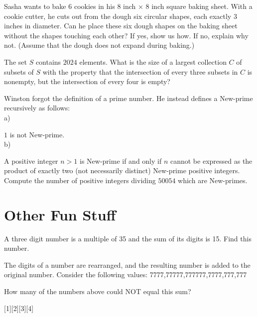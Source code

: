 \begin{problem}[C][6][BAMO 2024/2]
    Sasha wants to bake 6 cookies in his 8 inch × 8 inch square baking sheet. With a cookie cutter, he cuts out from the dough six circular shapes, each exactly 3 inches in diameter. Can he place these six dough shapes on the baking sheet without the shapes touching each other? If yes, show us how. If no, explain why not. (Assume that the dough does not expand during baking.)
\end{problem}


\begin{problem}[C][3][MP4G 2024/14]
    The set $S$ contains $2024$ elements. What is the size of a largest collection $C$ of subsets of $S$ with the property that the intersection of every three subsets in $C$ is nonempty,
  but the intersection of every four is empty?
\end{problem}


\begin{problem}
    Winston forgot the definition of a prime number. He instead defines a New-prime recursively as follows: \\
   a) \item \(1\) is not New-prime. \\
   b) \item A positive integer \( n > 1 \) is New-prime if and only if \( n \) cannot be expressed as the product of exactly two (not necessarily distinct) New-prime positive integers. \\
Compute the number of positive integers dividing \(50054\) which are New-primes.

\end{problem}


\section{Other Fun Stuff}\setcounter{problem}{0}


\begin{problem}
    A three digit number is a multiple of 35 and the sum of its digits is 15. Find this number.
\end{problem}

\begin{problem}
    The digits of a number are rearranged, and the resulting number is added to the original number. Consider the following values:\smallbreak
    \hspace{25pt}777\hfill7,777\hfill77,777\hfill777,777\hfill7,777,777\hspace{25pt}\smallbreak

    How many of the numbers above could NOT equal this sum?
    \end{problem}
    [1][2][3][4]

